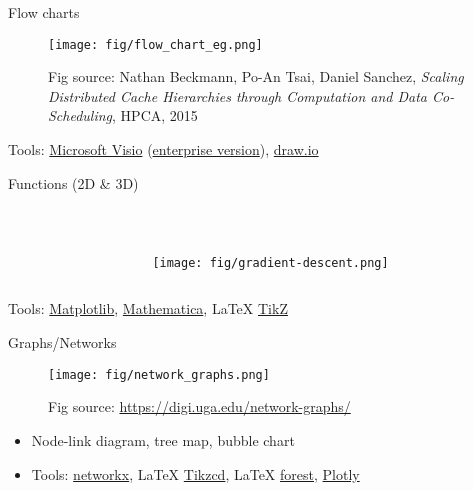 \documentclass{../TexTemplate/myslide}
\begin{document}
\begin{frame}{Flow charts}
\begin{figure}
\centering
\texttt{[image: fig/flow\_chart\_eg.png]}
\caption*{\scriptsize Fig source: Nathan Beckmann, Po-An Tsai, Daniel Sanchez, \emph{Scaling Distributed Cache Hierarchies through Computation and Data Co-Scheduling}, HPCA, 2015}
\end{figure}
Tools: \href{https://products.office.com/en-us/visio/flowchart-software}{Microsoft Visio} (\href{https://ms.sysu.edu.cn/}{enterprise version}), \href{https://www.draw.io/}{draw.io}
\end{frame}

\begin{frame}{Functions (2D \& 3D)}
\begin{columns}
\begin{column}{0.45\linewidth}
\begin{center}
\end{center}
\end{column}
\begin{column}{0.55\linewidth}
\qquad\\
\bigskip
\begin{figure}
\centering
\texttt{[image: fig/gradient-descent.png]}
\end{figure}
\end{column}
\end{columns}
\bigskip
Tools: \href{https://matplotlib.org/}{Matplotlib}, \href{https://www.wolfram.com/mathematica/}{Mathematica}, \LaTeX{} \href{http://www.texample.net/tikz/}{TikZ}
\end{frame}

\begin{frame}{Graphs/Networks}
\begin{figure}
\centering
\texttt{[image: fig/network\_graphs.png]}
\caption*{\scriptsize Fig source: \url{https://digi.uga.edu/network-graphs/}}
\end{figure}
\begin{itemize}
	\item Node-link diagram, tree map, bubble chart
	\item Tools: \href{https://networkx.github.io/}{networkx}, \LaTeX{} \href{http://ctan.math.washington.edu/tex-archive/graphics/pgf/contrib/tikz-cd/tikz-cd-doc.pdf}{Tikzcd}, \LaTeX{} \href{http://mirrors.ibiblio.org/CTAN/graphics/pgf/contrib/forest/forest-doc.pdf}{forest}, \href{https://plot.ly/}{Plotly}
\end{itemize}
\end{frame}
\end{document}
